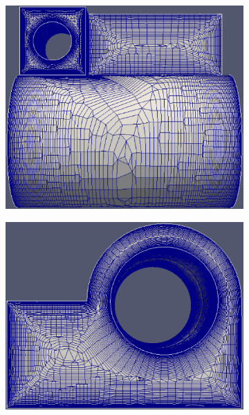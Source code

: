 \begin{figure}[hbt!]
\begin{subfigure}{.33\textwidth}
		\caption{}
		\label{fig-joint-side}
	\end{subfigure}
	\begin{subfigure}{.33\textwidth}
		\centering
		\includegraphics[width=.9\linewidth]{img/r/joint-x0.004-g1.04-a5/top.eps}
		\caption{}
		\label{fig-joint-top}
	\end{subfigure}%
	\begin{subfigure}{0.33\textwidth}
		\centering
		\includegraphics[width=0.9\linewidth]{img/r/joint-x0.004-g1.04-a5/front.eps}
		\caption{}
		\label{fig-joint-front}
	\end{subfigure}%
	\begin{subfigure}{0.33\textwidth}
		\centering

\end{subfigure}
\end{figure}
